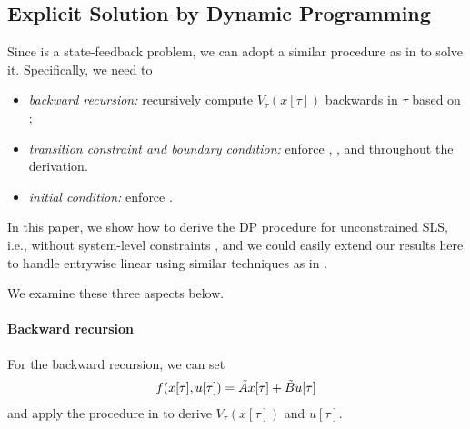 \fi

\subsection{Explicit Solution by Dynamic Programming}
Since  is a state-feedback problem, we can adopt a similar procedure as in \cite{tseng2020system} to solve it. Specifically, we need to 
\begin{itemize}
\item {\it backward recursion:} recursively compute $V_\tau(x[\tau])$ backwards in $\tau$ based on ;
\item {\it transition constraint and boundary condition:} enforce , , and  throughout the derivation.
\item {\it initial condition:} enforce .
\end{itemize}
In this paper, we show how to derive the DP procedure for unconstrained SLS, i.e.,  without system-level constraints , and we could easily extend our results here to handle entrywise linear  using similar techniques as in \cite[Section II C]{tseng2020system}.

We examine these three aspects below. 

\paragraph{Backward recursion}
For the backward recursion, we can set
\begin{align*}
f(x[\tau], u[\tau]) = \tilde{A} x[\tau] + \tilde{B} u[\tau]
\end{align*}
and apply the procedure in  to derive $V_\tau(x[\tau])$ and $u[\tau]$. 

\iffalse
For the backward recursion, we can compute $\tdA$ and $\tdB$ by
\begin{align*}
x[\tau + 1] =&\ 
\mat{0 & I}
\mat{
x_{xx}[\tau + 1]\\
x[\tau+1]
}\\ 
=&\ 
\mat{0 & I} \left(
\tilde{A} x[\tau] + \tilde{B} u[\tau] 
\right)\\
=&\ \tdA x[\tau] + \tdB u[\tau] = f(x[\tau], u[\tau]).
\end{align*}
Accordingly, we can directly apply the procedure in \sec{preliminaries-DP} to derive $V_\tau(x[\tau])$ and $u[\tau]$.
\fi

